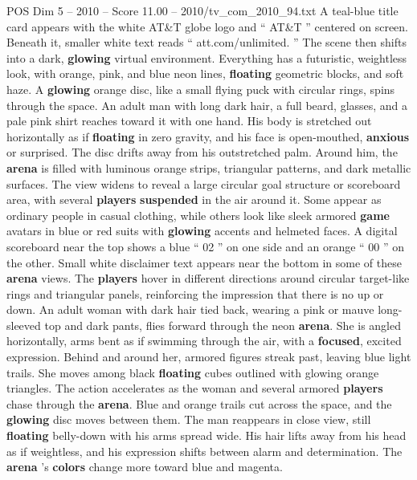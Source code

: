 \begin{textsample}{POS Dim 5 – 2010 – Score 11.00 – 2010/tv\_com\_2010\_94.txt}  \label{ex:f5_pos_043}
A teal-blue title card appears with the white AT\&T globe logo and “ AT\&T ” centered on screen.
Beneath it, smaller white text reads “ att.com/unlimited. ” The scene then shifts into a dark, \textbf{glowing} virtual environment.
Everything has a futuristic, weightless look, with orange, pink, and blue neon lines, \textbf{floating} geometric blocks, and soft haze.
A \textbf{glowing} orange disc, like a small flying puck with circular rings, spins through the space.
An adult man with long dark hair, a full beard, glasses, and a pale pink shirt reaches toward it with one hand.
His body is stretched out horizontally as if \textbf{floating} in zero gravity, and his face is open-mouthed, \textbf{anxious} or surprised.
The disc drifts away from his outstretched palm.
Around him, the \textbf{arena} is filled with luminous orange strips, triangular patterns, and dark metallic surfaces.
The view widens to reveal a large circular goal structure or scoreboard area, with several \textbf{players} \textbf{suspended} in the air around it.
Some appear as ordinary people in casual clothing, while others look like sleek armored \textbf{game} avatars in blue or red suits with \textbf{glowing} accents and helmeted faces.
A digital scoreboard near the top shows a blue “ 02 ” on one side and an orange “ 00 ” on the other.
Small white disclaimer text appears near the bottom in some of these \textbf{arena} views.
The \textbf{players} hover in different directions around circular target-like rings and triangular panels, reinforcing the impression that there is no up or down.
An adult woman with dark hair tied back, wearing a pink or mauve long-sleeved top and dark pants, flies forward through the neon \textbf{arena}.
She is angled horizontally, arms bent as if swimming through the air, with a \textbf{focused}, excited expression.
Behind and around her, armored figures streak past, leaving blue light trails.
She moves among black \textbf{floating} cubes outlined with glowing orange triangles.
The action accelerates as the woman and several armored \textbf{players} chase through the \textbf{arena}.
Blue and orange trails cut across the space, and the \textbf{glowing} disc moves between them.
The man reappears in close view, still \textbf{floating} belly-down with his arms spread wide.
His hair lifts away from his head as if weightless, and his expression shifts between alarm and determination.
The \textbf{arena} ’s \textbf{colors} change more toward blue and magenta.

\end{textsample}
